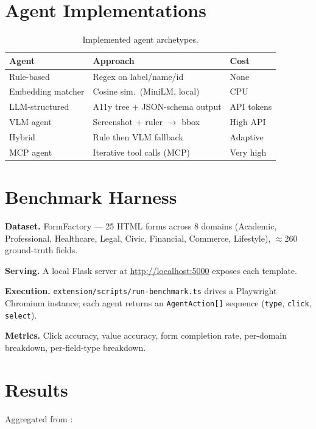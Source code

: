 \documentclass[conference]{IEEEtran}
\begin{document}
\section{Agent Implementations}
\begin{table}[h]
\centering
\caption{Implemented agent archetypes.}
\label{tab:agents}
\begin{tabular}{@{}lll@{}}
\toprule
\textbf{Agent} & \textbf{Approach} & \textbf{Cost} \\
\midrule
Rule-based        & Regex on label/name/id          & None         \\
Embedding matcher & Cosine sim.\ (MiniLM, local)    & CPU          \\
LLM-structured    & A11y tree + JSON-schema output  & API tokens   \\
VLM agent         & Screenshot + ruler $\to$ bbox   & High API     \\
Hybrid            & Rule then VLM fallback          & Adaptive     \\
MCP agent         & Iterative tool calls (MCP)      & Very high    \\
\bottomrule
\end{tabular}
\end{table}

\section{Benchmark Harness}
\textbf{Dataset.} FormFactory --- 25 HTML forms across 8 domains
(Academic, Professional, Healthcare, Legal, Civic, Financial, Commerce,
Lifestyle), $\approx 260$ ground-truth fields.

\textbf{Serving.} A local Flask server at
\url{http://localhost:5000} exposes each template.

\textbf{Execution.} \texttt{extension/scripts/run-benchmark.ts} drives a
Playwright Chromium instance; each agent returns an
\texttt{AgentAction[]} sequence
(\texttt{type}, \texttt{click}, \texttt{select}).

\textbf{Metrics.} Click accuracy, value accuracy, form completion rate,
per-domain breakdown, per-field-type breakdown.

\section{Results}
Aggregated from :
\end{document}
